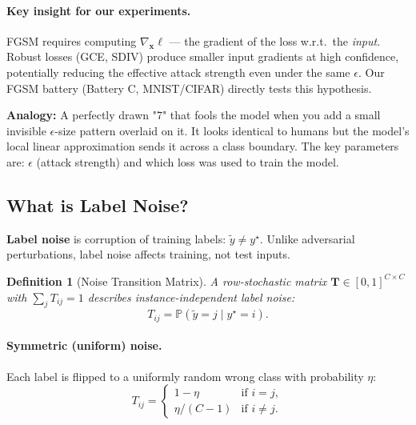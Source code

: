 \documentclass[11pt,a4paper]{article}
\newtheorem{definition}[theorem]{Definition}
\newcommand{\Prob}{\mathbb{P}}
\newcommand{\xb}{\mathbf{x}}
\newcommand{\Tb}{\mathbf{T}}
\begin{document}
\paragraph{Key insight for our experiments.}
FGSM requires computing $\nabla_{\xb} \ell$ — the gradient of the loss w.r.t.\ the \emph{input}.
Robust losses (GCE, SDIV) produce smaller input gradients at high confidence, potentially
reducing the effective attack strength even under the same $\epsilon$.
Our FGSM battery (Battery C, MNIST/CIFAR) directly tests this hypothesis.

\begin{tcolorbox}[colback=blue!5!white,colframe=blue!60!black,title=Intuition: Adversarial Attack]
\textbf{Analogy:} A perfectly drawn "7" that fools the model when you add a small
invisible $\epsilon$-size pattern overlaid on it. It looks identical to humans but the
model's local linear approximation sends it across a class boundary.
The key parameters are: $\epsilon$ (attack strength) and which loss was used to train the model.
\end{tcolorbox}

\subsection{What is Label Noise?}
\label{sec:labelnoise}

\textbf{Label noise} is corruption of training labels: $\tilde{y} \neq y^\star$.
Unlike adversarial perturbations, label noise affects training, not test inputs.

\begin{definition}[Noise Transition Matrix]
A row-stochastic matrix $\Tb \in [0,1]^{C\times C}$ with $\sum_j T_{ij} = 1$ describes
\emph{instance-independent} label noise:
\[
  T_{ij} = \Prob(\tilde{y} = j \mid y^\star = i).
\]
\end{definition}

\paragraph{Symmetric (uniform) noise.}
Each label is flipped to a uniformly random wrong class with probability $\eta$:
\[
  T_{ij} = \begin{cases} 1 - \eta & \text{if } i = j, \\ \eta/(C-1) & \text{if } i \neq j. \end{cases}
\]
\end{document}
